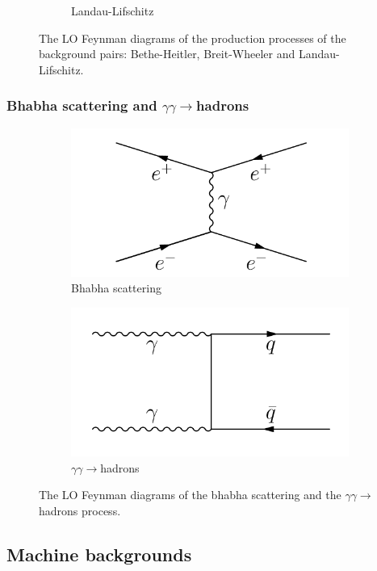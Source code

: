 \begin{figure}
\begin{subfigure}[b]{0.33\textwidth}
\caption{Landau-Lifschitz}
\end{subfigure}
\caption[LO Feynman diagrams of the production of the background pairs.]{The LO Feynman diagrams of the production processes of the background pairs: Bethe-Heitler, Breit-Wheeler and Landau-Lifschitz.}
\label{fig:Feynman:pair_production}
\end{figure}

\subsubsection{Bhabha scattering and $\gamma\gamma\rightarrow$hadrons}
\label{BeamBeam:bhabha_gammagamma}

\begin{figure}
\centering
\begin{subfigure}[b]{0.35\textwidth}
\includegraphics[width=\textwidth]{Figures/bhabha_scattering.pdf}
\caption{Bhabha scattering}
\end{subfigure}
\vspace*{0.2cm}
\begin{subfigure}[b]{0.35\textwidth}
\includegraphics[width=\textwidth]{Figures/gammagamma_hadrons.pdf}
\caption{$\gamma\gamma\rightarrow$hadrons}
\end{subfigure}
\caption[LO Feynman diagrams of bhabha scattering and the $\gamma\gamma\rightarrow$hadrons process.]{The LO Feynman diagrams of the bhabha scattering and the $\gamma\gamma\rightarrow$hadrons process.}
\label{fig:Feynman:bhabha_gammagamma}
\end{figure}

\subsection{Machine backgrounds}
\label{MachineBackgrounds}